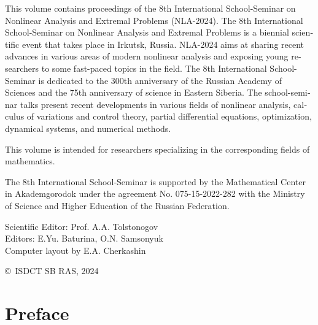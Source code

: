 \documentclass[12pt,final]{llncs}
\begin{document}
 \begin{english}
   This volume contains proceedings of the 8th International School-Seminar on Nonlinear Analysis and Extremal Problems (NLA-2024).
   The 8th International School-Seminar on Nonlinear Analysis and Extremal Problems is a biennial scientific event that takes place in Irkutsk, Russia. NLA-2024 aims at sharing recent advances in various areas of modern nonlinear analysis and exposing young researchers to some fast-paced topics in the field. The 8th International School-Seminar is dedicated to the 300th anniversary of the Russian Academy of Sciences and the 75th anniversary of science in Eastern Siberia.
   The school-seminar talks present recent developments in
   various fields of nonlinear analysis, calculus of variations and control theory,  partial differential equations, optimization, dynamical systems,
   and  numerical methods.

   This volume is intended for researchers specializing in the corresponding fields of  ma\-the\-ma\-tics.

   The 8th International School-Seminar is supported by the Mathematical Center in Akademgorodok under the agreement No. 075-15-2022-282 with the Ministry of Science and Higher Education of the Russian Federation.
 \end{english}
  \vspace{1cm}



 \vfill

  \vfill

 Scientific Editor: Prof. A.\;A. Tolstonogov\\[0.3em]

 Editors: E.\;Yu. Baturina, O.\;N. Samsonyuk\\[0.3em]

 Computer layout by E.\;A. Cherkashin

 \vfill



 \begin{flushright}
 \copyright\ ISDCT SB RAS, 2024
\end{flushright}


\chapter*{Preface}
%
\end{document}
